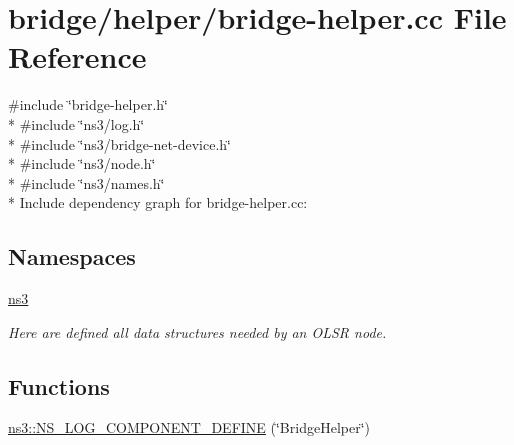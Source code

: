 \hypertarget{bridge-helper_8cc}{}\section{bridge/helper/bridge-\/helper.cc File Reference}
\label{bridge-helper_8cc}
{\ttfamily \#include \char`\"{}bridge-\/helper.\+h\char`\"{}}\\*
{\ttfamily \#include \char`\"{}ns3/log.\+h\char`\"{}}\\*
{\ttfamily \#include \char`\"{}ns3/bridge-\/net-\/device.\+h\char`\"{}}\\*
{\ttfamily \#include \char`\"{}ns3/node.\+h\char`\"{}}\\*
{\ttfamily \#include \char`\"{}ns3/names.\+h\char`\"{}}\\*
Include dependency graph for bridge-\/helper.cc\+:
\subsection*{Namespaces}
\begin{DoxyCompactItemize}
\item 
 \hyperlink{namespacens3}{ns3}
\begin{DoxyCompactList}\small\item\em Here are defined all data structures needed by an O\+L\+SR node. \end{DoxyCompactList}\end{DoxyCompactItemize}
\subsection*{Functions}
\begin{DoxyCompactItemize}
\item 
\hyperlink{namespacens3_a1ec2f404fa6a46b0d2189007dbc9a64f}{ns3\+::\+N\+S\+\_\+\+L\+O\+G\+\_\+\+C\+O\+M\+P\+O\+N\+E\+N\+T\+\_\+\+D\+E\+F\+I\+NE} (\char`\"{}Bridge\+Helper\char`\"{})
\end{DoxyCompactItemize}
